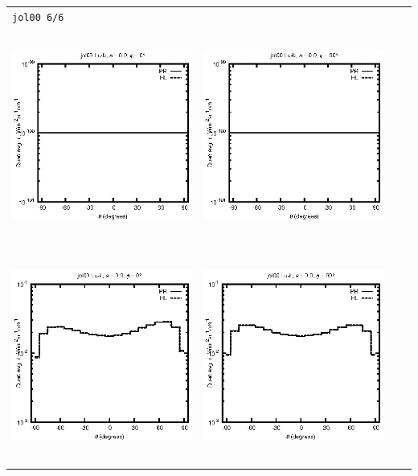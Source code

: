 \begin{tabular}{c c c c}
\multicolumn{4}{l}{\texttt{jol00 6/6}} \\
\includegraphics[height=7cm]{../eps/jol00_Lu_b_fwd.eps} &
\includegraphics[height=7cm]{../eps/jol00_Lu_b_cross.eps} \\
\includegraphics[height=7cm]{../eps/jol00_Lu_it_fwd.eps} &
\includegraphics[height=7cm]{../eps/jol00_Lu_it_cross.eps} \\

\end{tabular}
